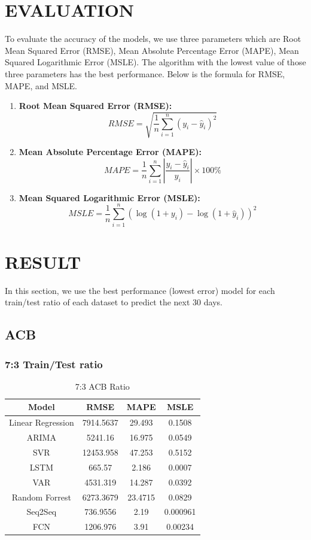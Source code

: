 \documentclass{ieeeojies}
\begin{document}
\section{EVALUATION}
To evaluate the accuracy of the models, we use three parameters 
which are Root Mean Squared Error (RMSE), Mean Absolute Percentage Error (MAPE), Mean Squared Logarithmic Error (MSLE). The algorithm with the lowest value of those three parameters has the best performance. Below is the formula for RMSE, MAPE, and MSLE.

\begin{enumerate}
\item \textbf{Root Mean Squared Error (RMSE):}
\[RMSE = \sqrt{\frac{1}{n} \sum_{i=1}^{n} (y_i - \hat{y}_i)^2}\]
\item  \textbf{Mean Absolute Percentage Error (MAPE):}
\[MAPE = \frac{1}{n} \sum_{i=1}^{n} \left| \frac{y_i - \hat{y}_i}{y_i} \right| \times 100\%\]
\item \textbf{Mean Squared Logarithmic Error (MSLE):}
\[MSLE = \frac{1}{n} \sum_{i=1}^{n} (\log(1 + y_i) - \log(1 + \hat{y}_i))^2\]
\end{enumerate}

\section{RESULT}
\label{sec:guidelines}
\hspace{1em}In this section, we use the best performance (lowest error) model for each train/test ratio of each dataset to predict the next 30 days. 
\subsection{ACB}
\subsubsection{7:3 Train/Test ratio}
\begin{table}[H]
    \centering
    \begin{tabular}{|c|c|c|c|}
    \hline
    Model & \textbf{RMSE} & \textbf{MAPE} & \textbf{MSLE} \\
    \hline
    Linear Regression & 7914.5637 & 29.493 & 0.1508 \\
    \hline
    ARIMA & 5241.16 & 16.975 & 0.0549 \\
    \hline
    SVR & 12453.958 & 47.253 & 0.5152 \\
    \hline
    \rowcolor{red!10}
    LSTM & 665.57 & 2.186 & 0.0007 \\
    \hline
    VAR & 4531.319 & 14.287 & 0.0392 \\
    \hline
    Random Forrest & 6273.3679 & 23.4715 & 0.0829 \\
    \hline
    Seq2Seq & 736.9556 & 2.19 & 0.000961 \\
    \hline
    FCN & 1206.976 & 3.91 & 0.00234 \\
    \hline
    \end{tabular}
    \caption{7:3 ACB Ratio}
    \label{tab:my_label}
\end{table}
\end{document}
